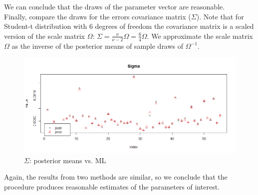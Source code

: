 \documentclass[12pt]{article}
\begin{document}
We can conclude that the draws of the parameter vector are reasonable. \\
Finally, compare the draws for the errors covariance matrix ($\Sigma$). Note that for Student-t distribution with 6 degrees of freedom the covariance matrix is a scaled version of the scale matrix $\Omega$: $\Sigma = \frac{\nu}{\nu - 2}\Omega = \frac{6}{4}\Omega$. We approximate the scale matrix $\Omega$ as the inverse of the posterior means of sample draws of $\Omega^{-1}$. 
\begin{figure}[!h]
	\centering
	\includegraphics[width=15cm]{Pics/SanityCheckSigma.png}
	\caption{$\Sigma$: posterior means vs. ML}
\end{figure}
Again, the results from two methods are similar, so we conclude that the procedure produces reasonable estimates of the parameters of interest.
\end{document}
